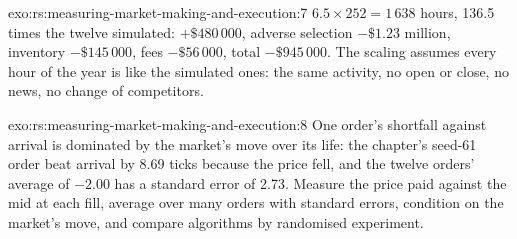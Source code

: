 \begin{solution}{exo:rs:measuring-market-making-and-execution:7}
$6.5 \times 252 = 1\,638$ hours, 136.5 times the twelve simulated:  $+\$480\,000$, adverse selection $-\$1.23$ million, inventory $-\$145\,000$, fees
$-\$56\,000$, total $-\$945\,000$. The scaling assumes every hour of the year is like the simulated ones: the same activity, no open or close, no news, no change of
competitors.
\end{solution}

\begin{solution}{exo:rs:measuring-market-making-and-execution:8}
One order's shortfall against arrival is dominated by the market's move over its life: the chapter's seed-61 order beat arrival by 8.69 ticks because the price fell,
and the twelve orders' average of $-2.00$ has a standard error of 2.73. Measure the price paid against the mid at each fill, average over many orders with standard
errors, condition on the market's move, and compare algorithms by randomised experiment.
\end{solution}

